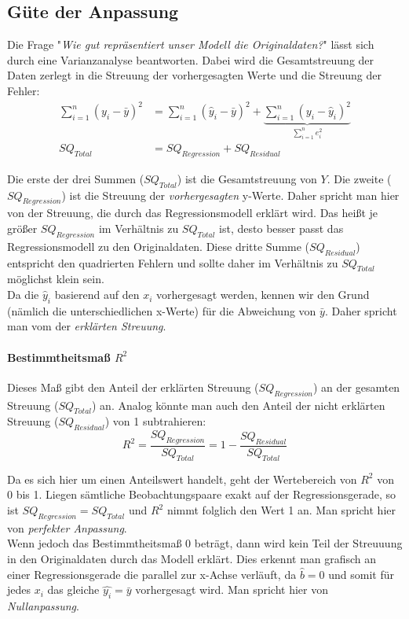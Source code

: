 \documentclass[a4paper]{article}
\newcommand\dangersign[1][2ex]{%
  \renewcommand\stacktype{L}%
  \scaleto{\stackon[1.3pt]{\color{red}$\triangle$}{\tiny !}}{#1}%
}
\begin{document}
\subsection{Güte der Anpassung}\label{sec:goodness-of-fit}
Die Frage "\textit{Wie gut repräsentiert unser Modell die Originaldaten?}" lässt sich durch eine Varianzanalyse beantworten. Dabei wird die Gesamtstreuung der Daten zerlegt in die Streuung der vorhergesagten Werte und die Streuung der Fehler:
\begin{align*}
    \sum_{i=1}^n(y_i-\bar{y})^2&=\sum_{i=1}^n(\hat{y}_i-\bar{y})^2 + \underbrace{\sum_{i=1}^n(y_i-\hat{y}_i)^2}_{\sum_{i=1}^n e_i^2}\\
    SQ_{Total}&=SQ_{Regression}+SQ_{Residual}
\end{align*}

\noindent Die erste der drei Summen ($SQ_{Total}$) ist die Gesamtstreuung von $Y$. Die zweite ($SQ_{Regression}$) ist die Streuung der \textit{vorhergesagten} y-Werte. Daher spricht man hier von der Streuung, die durch das Regressionsmodell erklärt wird. Das heißt je größer $SQ_{Regression}$ im Verhältnis zu $SQ_{Total}$ ist, desto besser passt das Regressionsmodell zu den Originaldaten. Diese dritte Summe ($SQ_{Residual}$) entspricht den quadrierten Fehlern und sollte daher im Verhältnis zu $SQ_{Total}$ möglichst klein sein.\\

\noindent \dangersign[3ex] Da die $\hat y_i$ basierend auf den $x_i$ vorhergesagt werden, kennen wir den Grund (nämlich die unterschiedlichen x-Werte) für die Abweichung von $\bar y$. Daher spricht man vom der \textit{erklärten Streuung}.

\paragraph{Bestimmtheitsmaß $R^2$} Dieses Maß gibt den Anteil der erklärten Streuung ($SQ_{Regression}$) an der gesamten Streuung ($SQ_{Total}$) an. Analog könnte man auch den Anteil der nicht erklärten Streuung ($SQ_{Residual}$) von 1 subtrahieren:
$$R^2 = \frac{SQ_{Regression}}{SQ_{Total}} = 1 - \frac{SQ_{Residual}}{SQ_{Total}}$$

\noindent Da es sich hier um einen Anteilswert handelt, geht der Wertebereich von $R^2$ von 0 bis 1.
Liegen sämtliche Beobachtungspaare exakt auf der Regressionsgerade, so ist $SQ_{Regression} = SQ_{Total}$ und $R^2$ nimmt folglich den Wert 1 an. Man spricht hier von \textit{perfekter Anpassung}.\\
Wenn jedoch das Bestimmtheitsmaß 0 beträgt, dann wird kein Teil der Streuuung in den Originaldaten durch das Modell erklärt. Dies erkennt man grafisch an einer Regressionsgerade die parallel zur x-Achse verläuft, da $\hat{b}=0$ und somit für jedes $x_i$ das gleiche $\hat{y_i} = \bar y$ vorhergesagt wird. Man spricht hier von \textit{Nullanpassung}.\\
\end{document}
